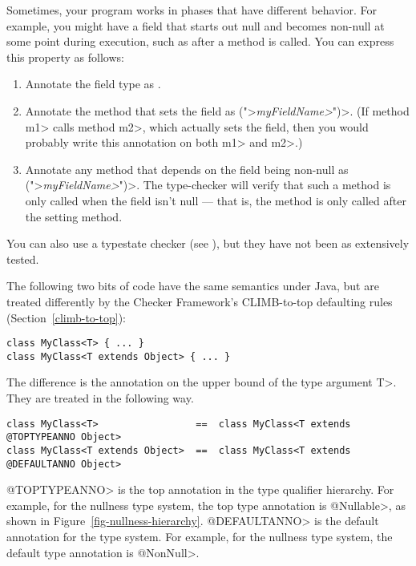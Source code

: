 Sometimes, your program works in phases that have different behavior.  For
example, you might have a field that starts out null and becomes non-null
at some point during execution, such as after a method is called.  You can
express this property as follows:

\begin{enumerate}
\item
Annotate the field type as .
\item
Annotate the method that sets the field as \<(">\emph{\<myFieldName>}\<")>.
(If method \<m1> calls method \<m2>, which actually sets the field, then
you would probably write this annotation on both \<m1> and \<m2>.)
\item
Annotate any method that depends on the field being non-null as
\<(">\emph{\<myFieldName>}\<")>.
The type-checker will verify that such a method is only called when the
field isn't null --- that is, the method is only called after the setting
method.
\end{enumerate}

You can also use a typestate checker (see
), but they have not been as extensively
tested.



The following two bits of code have the same semantics under Java, but are
treated differently by the Checker Framework's CLIMB-to-top defaulting
rules (Section~\ref{climb-to-top}):

\begin{Verbatim}
class MyClass<T> { ... }
class MyClass<T extends Object> { ... }
\end{Verbatim}

The difference is the annotation on the upper bound of the type argument
\<T>.  They are treated in the following way.

\begin{Verbatim}
class MyClass<T>                 ==  class MyClass<T extends @TOPTYPEANNO Object>
class MyClass<T extends Object>  ==  class MyClass<T extends @DEFAULTANNO Object>
\end{Verbatim}

\noindent
\<@TOPTYPEANNO> is the top annotation in the type qualifier hierarchy.  For
example, for the nullness type system, the top type annotation is
\<@Nullable>, as shown in Figure~\ref{fig-nullness-hierarchy}.
\<@DEFAULTANNO> is the default annotation for the type system.  For
example, for the nullness type system, the default type annotation is
\<@NonNull>.

